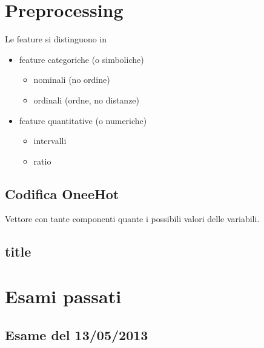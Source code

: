 \documentclass[12pt,a4paper,oneside]{book}
\begin{document}
\section{Preprocessing}

Le feature si distinguono in 
\begin{itemize}
	\item feature categoriche (o simboliche)
	\begin{itemize}
		\item nominali (no ordine)
		\item ordinali (ordne, no distanze)
	\end{itemize}
	\item feature quantitative (o numeriche)
	\begin{itemize}
		\item intervalli
		\item ratio
	\end{itemize}
\end{itemize}

\subsection{Codifica OneeHot}

Vettore con tante componenti quante i possibili valori delle variabili.

\subsection{title}

\section{Esami passati}

\subsection{Esame del 13/05/2013}
\end{document}
